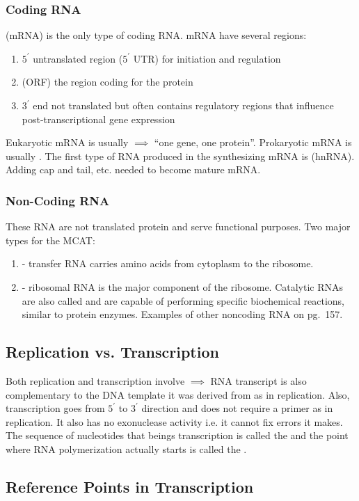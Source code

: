 \documentclass[../Bio_chemistryReview.tex]{subfiles}
\begin{document}
\subsubsection{Coding RNA}
 (mRNA) is the only type of coding RNA. mRNA have several
regions:
\begin{enumerate}
  \item $ 5^{\prime} $ untranslated region ($ 5^{\prime} $ UTR) for initiation
    and regulation
  \item {} (ORF) the region coding for the protein
  \item $ 3^{\prime} $ end not translated but often contains regulatory regions
    that influence post-transcriptional gene expression
\end{enumerate}
Eukaryotic mRNA is usually  $ \implies $ ``one gene, one
protein''. Prokaryotic mRNA is usually . The first type
of RNA produced in the synthesizing mRNA is 
(hnRNA). Adding cap and tail, etc. needed to become mature mRNA.

\subsubsection{Non-Coding RNA}
These RNA are not translated protein and serve functional purposes. Two major
types for the MCAT:
\begin{enumerate}
  \item {} - transfer RNA carries amino acids from cytoplasm to the
    ribosome.
  \item {} - ribosomal RNA is the major component of the ribosome.
    Catalytic RNAs are also called  and are capable of
    performing specific biochemical reactions, similar to protein enzymes.
    Examples of other noncoding RNA on pg.\ 157.
\end{enumerate}

\subsection{Replication vs. Transcription}
Both replication and transcription involve  $ \implies $ RNA transcript is also complementary to the DNA template it
was derived from as in replication. Also, transcription goes from $ 5^{\prime} $
to $ 3^{\prime} $ direction and does not require a primer as in replication. It
also has no exonuclease activity i.e. it cannot fix errors it makes. The
sequence of nucleotides that beings transcription is called the
 and the point where RNA polymerization actually starts is
called the .

\subsection{Reference Points in Transcription}
\end{document}
